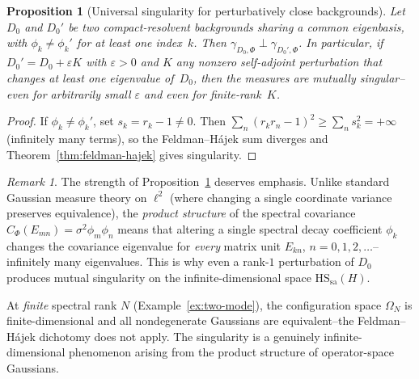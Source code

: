 \documentclass[12pt,a4paper]{article}
\theoremstyle{plain}
\newtheorem{proposition}[theorem]{Proposition}
\theoremstyle{definition}
\theoremstyle{remark}
\newtheorem{remark}[theorem]{Remark}
\newcommand{\HS}{\mathrm{HS}}
\newcommand{\sa}{\mathrm{sa}}
\begin{document}
\begin{proposition}[Universal singularity for perturbatively close
backgrounds]
\label{prop:fh-close}
Let $D_0$ and $D_0'$ be two compact-resolvent backgrounds
\emph{sharing a common eigenbasis}, with
$\phi_k \ne \phi_k'$ for at least one index~$k$.  Then
$\gamma_{D_0,\Phi} \perp \gamma_{D_0',\Phi}$.
In particular, if $D_0' = D_0 + \varepsilon K$ with $\varepsilon > 0$
and $K$ any nonzero self-adjoint perturbation that changes at least one
eigenvalue of~$D_0$, then the measures are mutually singular--even for
arbitrarily small $\varepsilon$ and even for finite-rank~$K$.
\end{proposition}

\begin{proof}
If $\phi_k \ne \phi_k'$, set $s_k = r_k - 1 \ne 0$.  Then
$\sum_n (r_k r_n - 1)^2 \ge \sum_n s_k^2 = +\infty$
(infinitely many terms), so the Feldman--H\'ajek sum diverges and
Theorem~\ref{thm:feldman-hajek} gives singularity.
\end{proof}

\begin{remark}\label{rem:fh-sharpness}
The strength of Proposition~\ref{prop:fh-close} deserves emphasis.
Unlike standard Gaussian measure theory on $\ell^2$ (where changing a
single coordinate variance preserves equivalence), the \emph{product
structure} of the spectral covariance
$C_\Phi(E_{mn}) = \sigma^2\phi_m\phi_n$ means that altering a single
spectral decay coefficient $\phi_k$ changes the covariance eigenvalue
for \emph{every} matrix unit $E_{kn}$, $n = 0,1,2,\ldots$--infinitely
many eigenvalues.  This is why even a rank-$1$ perturbation of $D_0$
produces mutual singularity on the infinite-dimensional space
$\HS_\sa(H)$.

At \emph{finite} spectral rank $N$ (Example~\ref{ex:two-mode}), the
configuration space $\Omega_N$ is finite-dimensional and all
nondegenerate Gaussians are equivalent--the Feldman--H\'ajek dichotomy
does not apply.  The singularity is a genuinely infinite-dimensional
phenomenon arising from the product structure of operator-space
Gaussians.
\end{remark}
\end{document}
